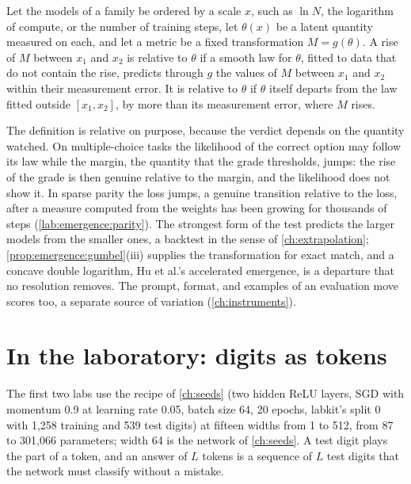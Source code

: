 \begin{refsection}
\begin{definition}\label{def:emergence:genuine}
Let the models of a family be ordered by a scale $x$, such as $\ln N$, the logarithm of compute, or the number of training steps, let $\theta(x)$ be a latent quantity measured on each, and let a metric be a fixed transformation $M=g(\theta)$. A rise of $M$ between $x_1$ and $x_2$ is  relative to $\theta$ if a smooth law for $\theta$, fitted to data that do not contain the rise, predicts through $g$ the values of $M$ between $x_1$ and $x_2$ within their measurement error. It is  relative to $\theta$ if $\theta$ itself departs from the law fitted outside $[x_1,x_2]$, by more than its measurement error, where $M$ rises.
\end{definition}

The definition is relative on purpose, because the verdict depends on the quantity watched. On multiple-choice tasks the likelihood of the correct option may follow its law while the margin, the quantity that the grade thresholds, jumps: the rise of the grade is then genuine relative to the margin, and the likelihood does not show it. In sparse parity the loss jumps, a genuine transition relative to the loss, after a measure computed from the weights has been growing for thousands of steps (\cref{lab:emergence:parity}). The strongest form of the test predicts the larger models from the smaller ones, a backtest in the sense of \cref{ch:extrapolation}; \cref{prop:emergence:gumbel}(iii) supplies the transformation for exact match, and a concave double logarithm, Hu et al.'s accelerated emergence, is a departure that no resolution removes. The prompt, format, and examples of an evaluation move scores too, a separate source of variation (\cref{ch:instruments}).

\section{In the laboratory: digits as tokens}\label{sec:emergence:lab}

The first two labs use the recipe of \cref{ch:seeds} (two hidden ReLU layers, SGD with momentum 0.9 at learning rate 0.05, batch size 64, 20 epochs, labkit's split 0 with 1,258 training and 539 test digits) at fifteen widths from 1 to 512, from 87 to 301,066 parameters; width 64 is the network of \cref{ch:seeds}. A test digit plays the part of a token, and an answer of $L$ tokens is a sequence of $L$ test digits that the network must classify without a mistake.


\end{refsection}
